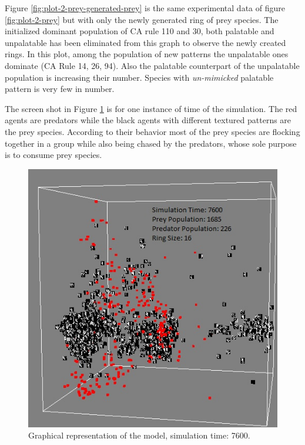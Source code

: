 Figure \ref{fig:plot-2-prey-generated-prey} is the same experimental data of figure \ref{fig:plot-2-prey} but with only the newly generated ring of prey species. The initialized dominant population of CA rule 110 and 30, both palatable and unpalatable has been eliminated from this graph to observe the newly created rings. In this plot, among the population of new patterns the unpalatable ones dominate (CA Rule 14, 26, 94). Also the palatable counterpart of the unpalatable population is increasing their number. Species with \textsl{un-mimicked} palatable pattern is very few in number.

The screen shot in Figure \ref{fig:screenshot-simTime7600-2-prey} is for one instance of time of the simulation. The red agents are predators while the black agents with different textured patterns are the prey species. According to their behavior most of the prey species are flocking together in a group while also being chased by the predators, whose sole purpose is to consume prey species. 

\begin{figure}[H]
	\centering
	\label{fig:screenshot-simTime7600-2-prey}
	\includegraphics[scale=0.55]{images/simTime7600}
	\caption[Graphical representation of the model (simulation time: 7600)]{Graphical representation of the model, simulation time: 7600.}
\end{figure}


